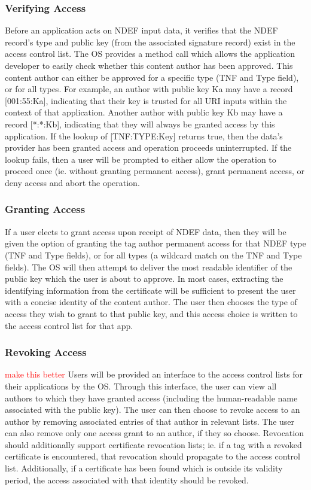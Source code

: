 \documentclass[12pt]{article}
\newcommand\todo[1]{\textcolor{red}{#1}}
\begin{document}
\subsubsection{Verifying Access}
Before an application acts on NDEF input data, it verifies that the NDEF record's type and public key (from the associated signature record) exist in the access control list.
The OS provides a method call which allows the application developer to easily check whether this content author has been approved.
This content author can either be approved for a specific type (TNF and Type field), or for all types.
For example, an author with public key Ka may have a record [001:55:Ka], indicating that their key is trusted for all URI inputs within the context of that application.
Another author with public key Kb may have a record [*:*:Kb], indicating that they will always be granted access by this application.
If the lookup of [TNF:TYPE:Key] returns true, then the data's provider has been granted access and operation proceeds uninterrupted.
If the lookup fails, then a user will be prompted to either allow the operation to proceed once (ie. without granting permanent access), grant permanent access, or deny access and abort the operation.
\subsubsection{Granting Access}
If a user elects to grant access upon receipt of NDEF data, then they will be given the option of granting the tag author permanent access for that NDEF type (TNF and Type fields), or for all types (a wildcard match on the TNF and Type fields).
The OS will then attempt to deliver the most readable identifier of the public key which the user is about to approve.
In most cases, extracting the identifying information from the certificate will be sufficient to present the user with a concise identity of the content author.
The user then chooses the type of access they wish to grant to that public key, and this access choice is written to the access control list for that app.
\subsubsection{Revoking Access}
\todo{make this better}
Users will be provided an interface to the access control lists for their applications by the OS.
Through this interface, the user can view all authors to which they have granted access (including the human-readable name associated with the public key).
The user can then choose to revoke access to an author by removing associated entries of that author in relevant lists.
The user can also remove only one access grant to an author, if they so choose.
Revocation should additionally support certificate revocation lists; ie. if a tag with a revoked certificate is encountered, that revocation should propagate to the access control list.
Additionally, if a certificate has been found which is outside its validity period, the access associated with that identity should be revoked.
\end{document}
